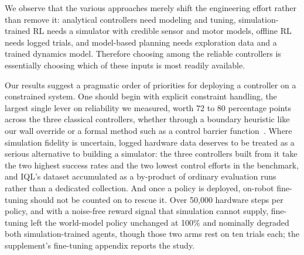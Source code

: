 We observe that the various approaches merely shift the engineering effort rather than remove it: analytical controllers need modeling and tuning, simulation-trained RL needs a simulator with credible sensor and motor models, offline RL needs logged trials, and model-based planning needs exploration data and a trained dynamics model.
Therefore choosing among the reliable controllers is essentially choosing which of these inputs is most readily available.


Our results suggest a pragmatic order of priorities for deploying a controller on a constrained system.
One should begin with explicit constraint handling, the largest single lever on reliability we measured, worth 72 to 80 percentage points across the three classical controllers, whether through a boundary heuristic like our wall override or a formal method such as a control barrier function~\cite{ames2019control}.
Where simulation fidelity is uncertain, logged hardware data deserves to be treated as a serious alternative to building a simulator: the three controllers built from it take the two highest success rates and the two lowest control efforts in the benchmark, and IQL's dataset accumulated as a by-product of ordinary evaluation runs rather than a dedicated collection.
And once a policy is deployed, on-robot fine-tuning should not be counted on to rescue it.
Over 50,000 hardware steps per policy, and with a noise-free reward signal that simulation cannot supply, fine-tuning left the world-model policy unchanged at 100\% and nominally degraded both simulation-trained agents, though those two arms rest on ten trials each; the supplement's fine-tuning appendix reports the study.

